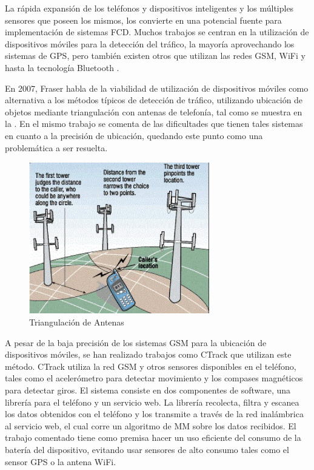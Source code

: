 La rápida expansión de los teléfonos y dispositivos inteligentes y los múltiples sensores que poseen los mismos, los convierte en una potencial fuente para implementación de sistemas FCD. Muchos trabajos se centran en la utilización de dispositivos móviles para la detección del tráfico, la mayoría aprovechando los sistemas de GPS, pero también existen otros que utilizan las redes GSM, WiFi y hasta la tecnología Bluetooth \cite{thiagarajan2010cooperative,thiagarajan2009vtrack,ruppe2012augmenting,fang2011enacq,fraser2007use}.

En 2007, Fraser \cite{fraser2007use} habla de la viabilidad de utilización de dispositivos móviles como alternativa a los métodos típicos de detección de tráfico, utilizando ubicación de objetos mediante triangulación con antenas de telefonía, tal como se muestra en la . En el mismo trabajo se comenta de las dificultades que tienen tales sistemas en cuanto a la precisión de ubicación, quedando este punto como una problemática a ser resuelta.

\begin{figure}[h]
	\centering
	\includegraphics[width=0.7\textwidth]{capitulos/3/figuras/figura5.jpg}
	\caption{\label{fig:triangulacionAntenas} Triangulación de Antenas}	
\end{figure}

A pesar de la baja precisión de los sistemas GSM para la ubicación de dispositivos móviles, se han realizado trabajos como CTrack \cite{thiagarajan2011accurate} que utilizan este método. CTrack utiliza la red GSM y  otros sensores disponibles en el teléfono, tales como el  acelerómetro para detectar movimiento y los compases magnéticos para detectar giros. El sistema consiste en dos componentes de software, una librería para el teléfono y un servicio web. La librería recolecta, filtra y escanea los datos obtenidos con el teléfono y los transmite a través de la red inalámbrica al servicio web, el cual corre un algoritmo de MM sobre los datos recibidos. El trabajo comentado tiene como premisa hacer un uso eficiente del consumo de la batería del dispositivo, evitando usar sensores de alto consumo tales como el sensor GPS o la antena WiFi.

